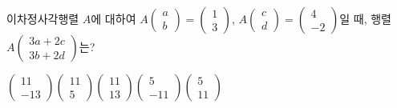 \hspace*{2mm}\begin{minipage}[t]{\dimexpr\linewidth-2mm\relax}\vspace{0pt}
이차정사각행렬 $A$에 대하여 $A\begin{pmatrix} a \\ b \end{pmatrix}=\begin{pmatrix} 1 \\ 3 \end{pmatrix}$, $A\begin{pmatrix} c \\ d \end{pmatrix}=\begin{pmatrix} 4 \\ -2 \end{pmatrix}$일 때, 행렬 $A\begin{pmatrix} 3a+2c \\ 3b+2d \end{pmatrix}$는? 
\begin{choices32}{$\begin{pmatrix} 11 \\ -13 \end{pmatrix}$}{$\begin{pmatrix} 11 \\ 5 \end{pmatrix}$}{$\begin{pmatrix} 11 \\ 13 \end{pmatrix}$}{$\begin{pmatrix} 5 \\ -11 \end{pmatrix}$}{$\begin{pmatrix} 5 \\ 11 \end{pmatrix}$}\end{choices32}\end{minipage}

